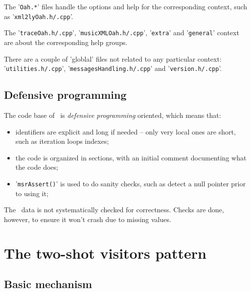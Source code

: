\documentclass[12pt,a4paper]{article}
\begin{document}
The '{\tt *Oah.*}' files handle the options and help for the corresponding context, such as '{\tt xml2lyOah.h/.cpp}'.

The '{\tt traceOah.h/.cpp}', '{\tt musicXMLOah.h/.cpp}', '{\tt extra}' and '{\tt general}' context are about the corresponding help groups.

There are a couple of 'globlal' files not related to any particular context: '{\tt utilities.h/.cpp}', '{\tt messagesHandling.h/.cpp}' and '{\tt version.h/.cpp}'.


\subsection{Defensive programming}

The code base of \xmlToLy\ is {\it defensive programming} oriented, which means that:
\begin{itemize}
\item identifiers are explicit and long if needed -- only very local ones are short, such as iteration loops indexes;

\item the code is organized in sections, with an initial comment documenting what the code does;

\item '{\tt msrAssert()}' is used to do sanity checks, such as detect a null pointer prior to using it;
\end{itemize}

The \mxml\ data is not systematically checked for correctness. Checks are done, however, to ensure it won't crash due to missing values.


\section{The two-shot visitors pattern}

\subsection{Basic mechanism}
\end{document}
